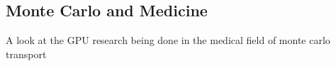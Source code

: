 \subsection{Monte Carlo and Medicine}

A look at the GPU research being done in the medical field of monte carlo transport